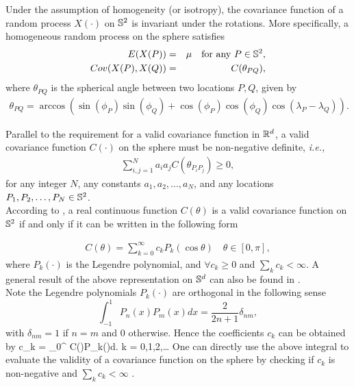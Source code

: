 Under the assumption of homogeneity (or isotropy), the covariance function of a random process $X(\cdot)$ on $\mathbb{S}^2$ is invariant under the rotations. More specifically, a homogeneous random process on the sphere satisfies
	\begin{eqnarray*}
	E(X(P)) &=& \mu \quad \mbox{for any } P \in \mathbb{S}^2, \\
		Cov(X(P),X(Q)) &=& C(\theta_{PQ}),
	\end{eqnarray*}
where $\theta_{PQ}$ is the spherical angle between two locations $P, Q$, given by 
	\begin{eqnarray*}
		\theta_{PQ}  = \arccos\left(\sin(\phi_P)\sin(\phi_Q) + \cos(\phi_P)\cos(\phi_Q)\cos(\lambda_P-\lambda_Q)\right).
	\end{eqnarray*}
	
Parallel to the requirement for a valid covariance function in $\mathbb{R}^d$, a valid covariance function $C(\cdot)$ on the sphere must be non-negative definite, {\em i.e.,}
	\begin{eqnarray*}
	\sum_{i,j=1}^{N} a_i a_j C(\theta_{P_iP_j}) \ge 0,
    \end{eqnarray*}
for any integer $N$, any constants $a_1, a_2, \ldots, a_N$, and any locations $P_1, P_2, \ldots, P_N \in \mathbb{S}^2$. \\

According to \cite{schoenberg1942}, a real continuous function $C(\theta)$ is a valid covariance function on $\mathbb{S}^2$ if and only if it can be written in the following form
	
	\begin{eqnarray*} \label{covs2_sum}
	C(\theta) = \sum_{k = 0}^\infty c_k P_k(\cos\theta) \quad \theta \in [0,\pi],
	\end{eqnarray*}
\noi where $P_k(\cdot)$ is the Legendre polynomial, and $\forall c_k\ge 0$ and $\sum_k c_k < \infty$. A general result of the above representation on $\mathbb{S}^d$ can also be found in \cite{schoenberg1942}. \\
	
Note the Legendre polynomials $P_k(\cdot)$ are orthogonal in the following sense
	\[
		\int_{-1}^{1} P_{n}(x)P_{m}(x)dx = \frac{2}{2n+1}\delta_{nm},
	\]
with $\delta_{nm} = 1$ if $n=m$ and 0 otherwise. Hence the coefficients $c_k$ can be obtained by
	\beq \label{covs2_coef}
	c_{k} = \int_0^{\pi} C(\theta)P_{k}(\cos\theta)d\theta. \quad k = 0,1,2,\ldots
	\eeq
One can directly use the above integral to evaluate the validity of a covariance function on the sphere by checking if $c_k$ is non-negative and $\sum_k c_k < \infty$ . \\
	
